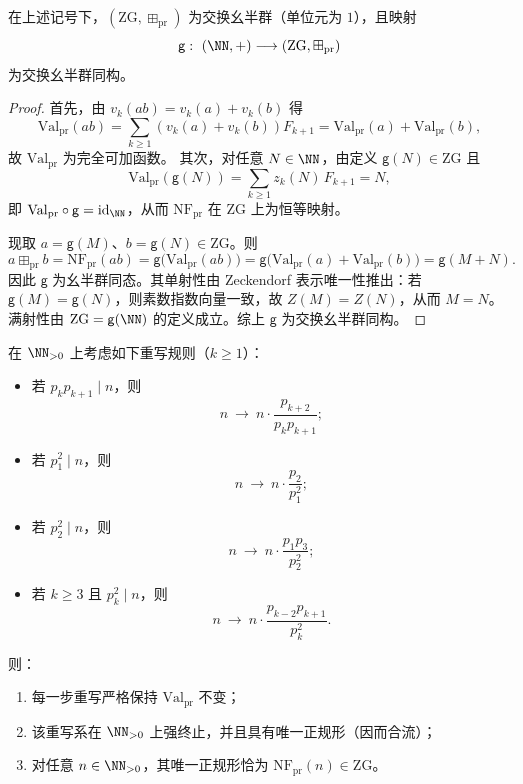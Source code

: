 \begin{theorem}[乘法归一化实现可加结构的严格同构]\label{thm:prime-register-multiplicative-normalization-additive-iso}
在上述记号下，\((\mathrm{ZG},\boxplus_{\mathrm{pr}})\) 为交换幺半群（单位元为 \(1\)），且映射
\[
\mathsf{g}:\ (\NN,+)\longrightarrow (\mathrm{ZG},\boxplus_{\mathrm{pr}})
\]
为交换幺半群同构。
\end{theorem}

\begin{proof}
首先，由 \(v_k(ab)=v_k(a)+v_k(b)\) 得
\[
\mathrm{Val}_{\mathrm{pr}}(ab)=\sum_{k\ge 1}(v_k(a)+v_k(b))F_{k+1}
=\mathrm{Val}_{\mathrm{pr}}(a)+\mathrm{Val}_{\mathrm{pr}}(b),
\]
故 \(\mathrm{Val}_{\mathrm{pr}}\) 为完全可加函数。
其次，对任意 \(N\in\NN\)，由定义 \(\mathsf{g}(N)\in\mathrm{ZG}\) 且
\[
\mathrm{Val}_{\mathrm{pr}}(\mathsf{g}(N))
=\sum_{k\ge 1} z_k(N)\,F_{k+1}
=N,
\]
即 \(\mathrm{Val}_{\mathrm{pr}}\circ \mathsf{g}=\mathrm{id}_{\NN}\)，从而 \(\mathrm{NF}_{\mathrm{pr}}\) 在 \(\mathrm{ZG}\) 上为恒等映射。

现取 \(a=\mathsf{g}(M)\)、\(b=\mathsf{g}(N)\in\mathrm{ZG}\)。则
\[
a\boxplus_{\mathrm{pr}} b
=\mathrm{NF}_{\mathrm{pr}}(ab)
=\mathsf{g}\bigl(\mathrm{Val}_{\mathrm{pr}}(ab)\bigr)
=\mathsf{g}\bigl(\mathrm{Val}_{\mathrm{pr}}(a)+\mathrm{Val}_{\mathrm{pr}}(b)\bigr)
=\mathsf{g}(M+N).
\]
因此 \(\mathsf{g}\) 为幺半群同态。其单射性由 Zeckendorf 表示唯一性推出：若 \(\mathsf{g}(M)=\mathsf{g}(N)\)，则素数指数向量一致，故 \(Z(M)=Z(N)\)，从而 \(M=N\)。
满射性由 \(\mathrm{ZG}=\mathsf{g}(\NN)\) 的定义成立。综上 \(\mathsf{g}\) 为交换幺半群同构。
\end{proof}

\begin{proposition}[素数替换重写系的终止合流与正规形判定]\label{prop:prime-register-rewrite-confluent-normal-form}
在 \(\NN_{>0}\) 上考虑如下重写规则（\(k\ge 1\)）：
\begin{itemize}
  \item 若 \(p_kp_{k+1}\mid n\)，则
  \[
  n\ \longrightarrow\ n\cdot \frac{p_{k+2}}{p_kp_{k+1}} ;
  \]
  \item 若 \(p_1^2\mid n\)，则
  \[
  n\ \longrightarrow\ n\cdot \frac{p_2}{p_1^2};
  \]
  \item 若 \(p_2^2\mid n\)，则
  \[
  n\ \longrightarrow\ n\cdot \frac{p_1p_3}{p_2^2};
  \]
  \item 若 \(k\ge 3\) 且 \(p_k^2\mid n\)，则
  \[
  n\ \longrightarrow\ n\cdot \frac{p_{k-2}p_{k+1}}{p_k^2}.
  \]
\end{itemize}
则：
\begin{enumerate}
  \item 每一步重写严格保持 \(\mathrm{Val}_{\mathrm{pr}}\) 不变；
  \item 该重写系在 \(\NN_{>0}\) 上强终止，并且具有唯一正规形（因而合流）；
  \item 对任意 \(n\in\NN_{>0}\)，其唯一正规形恰为 \(\mathrm{NF}_{\mathrm{pr}}(n)\in\mathrm{ZG}\)。
\end{enumerate}
\end{proposition}

